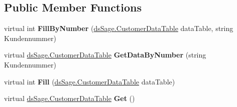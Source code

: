 \subsection*{Public Member Functions}
\begin{DoxyCompactItemize}
\item 
virtual int {\bfseries Fill\+By\+Number} (\hyperlink{class_products_1_1_data_1_1ds_sage_1_1_customer_data_table}{ds\+Sage.\+Customer\+Data\+Table} data\+Table, string Kundennummer)\hypertarget{class_products_1_1_data_1_1ds_sage_table_adapters_1_1ta_customer_a445519dbee8508e0250adcd63b216345}{}\label{class_products_1_1_data_1_1ds_sage_table_adapters_1_1ta_customer_a445519dbee8508e0250adcd63b216345}

\item 
virtual \hyperlink{class_products_1_1_data_1_1ds_sage_1_1_customer_data_table}{ds\+Sage.\+Customer\+Data\+Table} {\bfseries Get\+Data\+By\+Number} (string Kundennummer)\hypertarget{class_products_1_1_data_1_1ds_sage_table_adapters_1_1ta_customer_a4bc1aa48ebd173fcec1ec32a2b06b448}{}\label{class_products_1_1_data_1_1ds_sage_table_adapters_1_1ta_customer_a4bc1aa48ebd173fcec1ec32a2b06b448}

\item 
virtual int {\bfseries Fill} (\hyperlink{class_products_1_1_data_1_1ds_sage_1_1_customer_data_table}{ds\+Sage.\+Customer\+Data\+Table} data\+Table)\hypertarget{class_products_1_1_data_1_1ds_sage_table_adapters_1_1ta_customer_adb56b7b1b204d0df1db00a5357601ec5}{}\label{class_products_1_1_data_1_1ds_sage_table_adapters_1_1ta_customer_adb56b7b1b204d0df1db00a5357601ec5}

\item 
virtual \hyperlink{class_products_1_1_data_1_1ds_sage_1_1_customer_data_table}{ds\+Sage.\+Customer\+Data\+Table} {\bfseries Get} ()\hypertarget{class_products_1_1_data_1_1ds_sage_table_adapters_1_1ta_customer_a36ef587697863240ae30ad74052f6ac2}{}\label{class_products_1_1_data_1_1ds_sage_table_adapters_1_1ta_customer_a36ef587697863240ae30ad74052f6ac2}

\end{DoxyCompactItemize}
